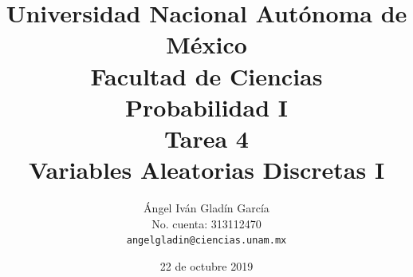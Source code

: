 \documentclass[11pt,letterpaper]{report}
\begin{document}
\title{
        Universidad Nacional Autónoma de México\\
        Facultad de Ciencias\\
        Probabilidad I\\
    \vspace{1cm}
    \large
        \textbf{Tarea 4}\\
        \textbf{Variables Aleatorias Discretas I}
}
\author{
    Ángel Iván Gladín García\\
    No. cuenta: 313112470\\
    \texttt{angelgladin@ciencias.unam.mx}
}
\date{22 de octubre 2019}
\maketitle

\newtheorem{theorem}{Teorema}
\newtheorem{example}{Ejemplo}
\newtheorem{corollary}{Corolario}
\newtheorem{lemma}{Lemma}
\newtheorem{definition}{Definicion}
\newtheorem{prop}{Proposicion}
\end{document}
